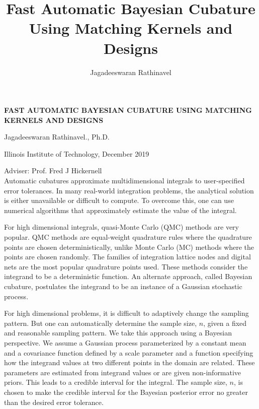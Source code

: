 \documentclass[11pt]{report}
\title{
		Fast Automatic Bayesian Cubature Using 
		Matching Kernels and Designs
	}
\author{Jagadeeswaran Rathinavel}
\begin{document}
	\pagestyle{empty}
\noindent
\textbf{FAST AUTOMATIC BAYESIAN CUBATURE USING MATCHING KERNELS AND DESIGNS}

\noindent
Jagadeeswaran Rathinavel., Ph.D.

\noindent
Illinois Institute of Technology, December 2019

\noindent
Adviser: Prof. Fred J Hickernell 
\\ %

	
	Automatic cubatures approximate multidimensional integrals to user-specified error tolerances. 
	In many real-world integration problems, the analytical solution is either unavailable or difficult to compute.
	To overcome this, one can use numerical algorithms that approximately estimate the value of the integral. 
	
	For high dimensional integrals, quasi-Monte Carlo (QMC) methods are very popular.
	QMC methods are equal-weight quadrature rules where the quadrature points are chosen deterministically, unlike Monte Carlo (MC) methods where the points are chosen randomly.
	The families of integration lattice nodes and digital nets are the most popular quadrature points used. 
	These methods consider the integrand to be a deterministic function.
	An alternate approach, called Bayesian cubature, postulates the integrand to be an instance of a Gaussian stochastic process.  
	
	For high dimensional problems, it is difficult to adaptively change the sampling pattern. But one can automatically determine the sample size, $n$, given a fixed and reasonable sampling pattern. We take this approach using a Bayesian perspective.
	We assume a Gaussian process parameterized by a constant mean and a covariance function defined by a scale parameter and a function specifying how the integrand values at two different points in the domain are related.
	These parameters are estimated from integrand values or are given non-informative priors. This leads to a credible interval for the integral.  The sample size, $n$, is chosen to make the credible interval for the Bayesian posterior error no greater than the desired error tolerance. 
	
\end{document}
